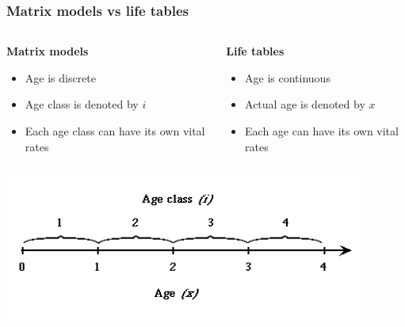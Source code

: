 \documentclass[color=usenames,dvipsnames]{beamer}\usepackage[]{graphicx}\usepackage[]{color}
\begin{document}
\begin{frame}
  \frametitle{Matrix models vs life tables}
  \begin{columns}
    \begin{column}[T]{0.5\textwidth}
      {\bf Matrix models}
      \begin{itemize}
        \item<1-> Age is discrete
        \item<2-> Age class is denoted by $i$
        \item<3-> Each age class can have its own vital rates
      \end{itemize}
    \end{column}
    \begin{column}[T]{0.5\textwidth}
      {\bf Life tables}
      \begin{itemize}
        \item<1-> Age is continuous
        \item<2-> Actual age is denoted by $x$
        \item<3-> Each age can have its own vital rates
      \end{itemize}
    \end{column}
  \end{columns}
  \begin{center}
    \includegraphics[width=0.9\textwidth]{figs/age-class-diagram}
  \end{center}
\end{frame}



\end{document}
